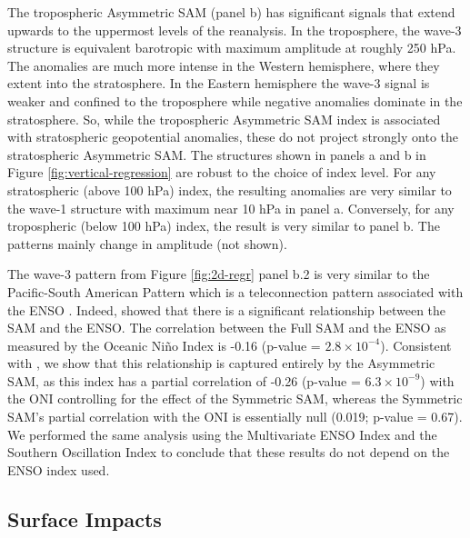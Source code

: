 \documentclass[]{ametsocV5}
\begin{document}
The tropospheric Asymmetric SAM (panel b) has significant signals that extend upwards to the uppermost levels of the reanalysis. In the troposphere, the wave-3 structure is equivalent barotropic with maximum amplitude at roughly 250 hPa. The anomalies are much more intense in the Western hemisphere, where they extent into the stratosphere. In the Eastern hemisphere the wave-3 signal is weaker and confined to the troposphere while negative anomalies dominate in the stratosphere. So, while the tropospheric Asymmetric SAM index is associated with stratospheric geopotential anomalies, these do not project strongly onto the stratospheric Asymmetric SAM. The structures shown in panels a and b in Figure \ref{fig:vertical-regression} are robust to the choice of index level. For any stratospheric (above 100 hPa) index, the resulting anomalies are very similar to the wave-1 structure with maximum near 10 hPa in panel a. Conversely, for any tropospheric (below 100 hPa) index, the result is very similar to panel b. The patterns mainly change in amplitude (not shown).

The wave-3 pattern from Figure \ref{fig:2d-regr} panel b.2 is very similar to the Pacific-South American Pattern \citep{mo1987, kidson1988} which is a teleconnection pattern associated with the ENSO \citep{karoly1989}. Indeed, \citet{fogt2011} showed that there is a significant relationship between the SAM and the ENSO. The correlation between the Full SAM and the ENSO as measured by the Oceanic Niño Index \citep[ONI,][]{bamston1997} is -0.16 (p-value = \ensuremath{2.8\times 10^{-4}}). Consistent with \citet{fan2007}, we show that this relationship is captured entirely by the Asymmetric SAM, as this index has a partial correlation of -0.26 (p-value = \ensuremath{6.3\times 10^{-9}}) with the ONI controlling for the effect of the Symmetric SAM, whereas the Symmetric SAM's partial correlation with the ONI is essentially null (0.019; p-value = 0.67). We performed the same analysis using the Multivariate ENSO Index \citep{wolter2011} and the Southern Oscillation Index \citep{ropelewski1987} to conclude that these results do not depend on the ENSO index used.

\hypertarget{impacts}{%
\subsection{Surface Impacts}\label{impacts}}
\end{document}
